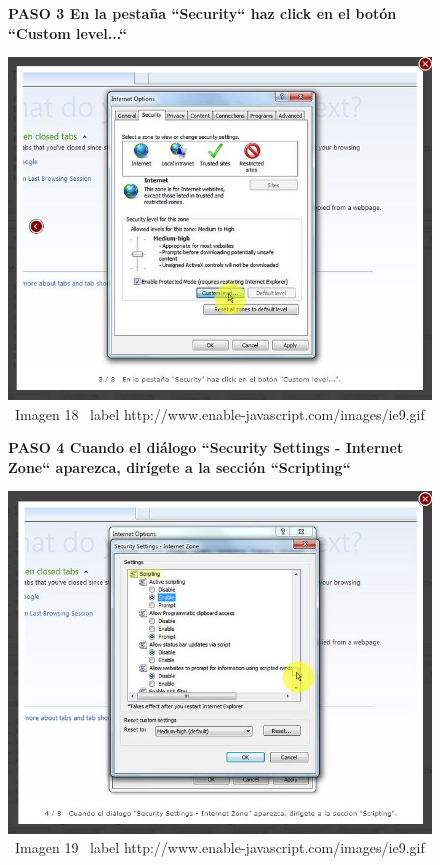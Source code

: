 \documentclass[11pt]{article} %
\begin{document}
\begin{figure}
\begin{center}

\begin{center}
\bf PASO 3
En la pestaña ``Security`` haz click en el botón ``Custom level...``
\end{center}
\includegraphics[height=8 cm, width=8 cm] {imagenes/explorer 03.JPG}
\newline
\newline
\ Imagen 18 
\ label {http://www.enable-javascript.com/images/ie9.gif }
\newline
\begin{center}
\bf PASO 4
Cuando el diálogo ``Security Settings - Internet Zone`` aparezca, dirígete a la sección ``Scripting``
\end{center}
\includegraphics[height=8 cm, width=8 cm] {imagenes/explorer 04.JPG}
\newline
\newline
\ Imagen 19
\ label {http://www.enable-javascript.com/images/ie9.gif }

\end{center}
\end{figure}
\end{document}

